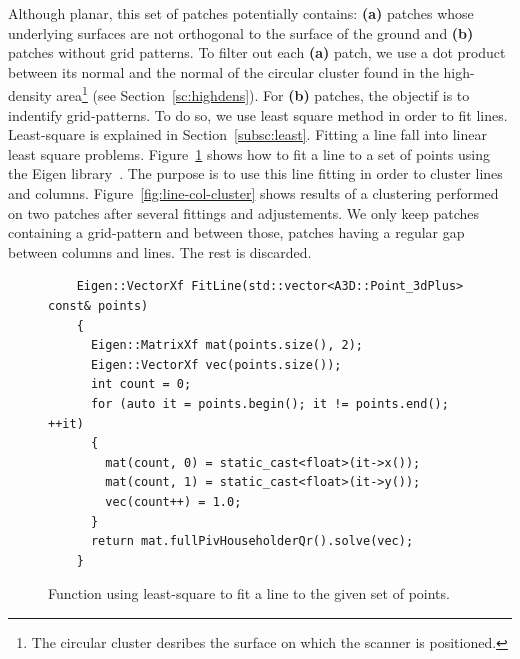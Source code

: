 Although planar, this set of patches potentially contains: \textbf{(a)} patches whose underlying surfaces are not orthogonal to the surface of the ground and \textbf{(b)} patches without grid patterns. To filter out each \textbf{(a)} patch, we use a dot product between its normal and the normal of the circular cluster found in the high-density area\footnote{The circular cluster desribes the surface on which the scanner is positioned.} (see Section~\ref{sc:highdens}). For \textbf{(b)} patches, the objectif is to indentify grid-patterns. To do so, we use least square method in order to fit lines. Least-square is explained in Section~\ref{subsc:least}. Fitting a line fall into linear least square problems. Figure~\ref{fig:fitline} shows how to fit a line to a set of points using the Eigen library~\cite{eigenweb}. The purpose is to use this line fitting in order to cluster lines and columns. Figure~\ref{fig:line-col-cluster} shows results of a clustering performed on two patches after several fittings and adjustements. We only keep patches containing a grid-pattern and between those, patches having a regular gap between columns and lines. The rest is discarded.

\begin{figure}
  \centering
  \begin{lstlisting}
    Eigen::VectorXf FitLine(std::vector<A3D::Point_3dPlus> const& points)
    {
      Eigen::MatrixXf mat(points.size(), 2);
      Eigen::VectorXf vec(points.size());
      int count = 0;
      for (auto it = points.begin(); it != points.end(); ++it)
      {
        mat(count, 0) = static_cast<float>(it->x());
        mat(count, 1) = static_cast<float>(it->y());
        vec(count++) = 1.0;
      }
      return mat.fullPivHouseholderQr().solve(vec);
    }
  \end{lstlisting}
  \caption{Function using least-square to fit a line to the given set of points.}
  \label{fig:fitline}
\end{figure}


